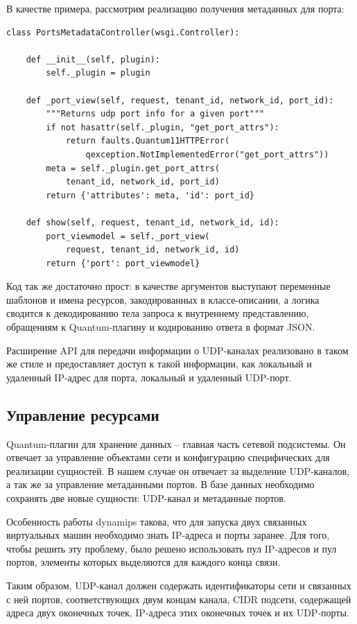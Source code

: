 В качестве примера, рассмотрим реализацию получения метаданных для порта:
\begin{lstlisting}
class PortsMetadataController(wsgi.Controller):

    def __init__(self, plugin):
        self._plugin = plugin

    def _port_view(self, request, tenant_id, network_id, port_id):
        """Returns udp port info for a given port"""
        if not hasattr(self._plugin, "get_port_attrs"):
            return faults.Quantum11HTTPError(
                qexception.NotImplementedError("get_port_attrs"))
        meta = self._plugin.get_port_attrs(
            tenant_id, network_id, port_id)
        return {'attributes': meta, 'id': port_id}

    def show(self, request, tenant_id, network_id, id):
        port_viewmodel = self._port_view(
            request, tenant_id, network_id, id)
        return {'port': port_viewmodel}
\end{lstlisting}
Код так же достаточно прост: в качестве аргументов выступают переменные шаблонов и 
имена ресурсов, закодированных в классе-описании, а логика сводится к декодированию
тела запроса к внутреннему представлению, обращениям к Quantum-плагину и кодированию
ответа в формат JSON.

Расширение API для передачи информации о UDP-каналах реализовано в таком же стиле
и предоставляет доступ к такой информации, как локальный и удаленный IP-адрес для порта,
локальный и удаленный UDP-порт.

\subsection{Управление ресурсами}

Quantum-плагин для хранение данных -- главная часть сетевой подсистемы. Он отвечает 
за управление объектами сети и конфигурацию специфических для реализации сущностей.
В нашем случае он отвечает за выделение UDP-каналов, а так же за управление метаданными портов. 
В базе данных необходимо сохранять две новые сущности: UDP-канал и метаданные портов. 

Особенность работы dynamips такова, что для запуска двух связанных виртуальных машин 
необходимо знать IP-адреса и порты заранее. Для того, чтобы решить эту проблему,
было решено использовать пул IP-адресов и пул портов, элементы которых 
выделяются для каждого конца связи.

Таким образом, UDP-канал должен содержать идентификаторы сети и связанных с ней портов, 
соответствующих двум концам канала, CIDR подсети, содержащей адреса двух
оконечных точек, IP-адреса этих оконечных точек и их UDP-порты.


